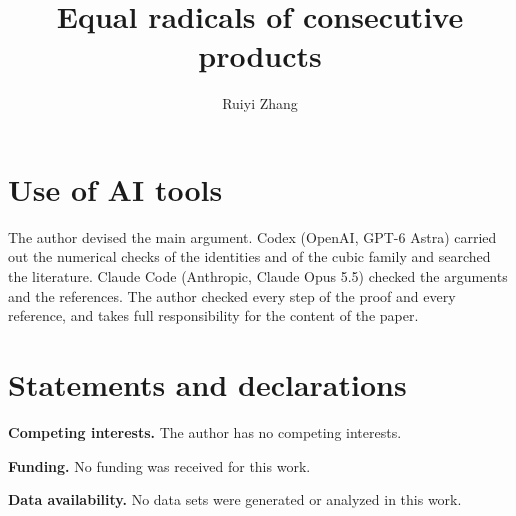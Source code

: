 \documentclass{amsart}
\title{Equal radicals of consecutive products}
\author{Ruiyi Zhang}
\theoremstyle{remark}
\numberwithin{equation}{section}
\begin{document}

\maketitle







\appendix


\section*{Use of AI tools}

The author devised the main argument. Codex (OpenAI, GPT-6 Astra) carried
out the numerical checks of the identities and of the cubic family and
searched the literature. Claude Code (Anthropic, Claude Opus 5.5) checked
the arguments and the references. The author checked every step of the
proof and every reference, and takes full responsibility for the content
of the paper.

\section*{Statements and declarations}

\textbf{Competing interests.} The author has no competing interests.

\textbf{Funding.} No funding was received for this work.

\textbf{Data availability.} No data sets were generated or analyzed in this
work.
\end{document}
